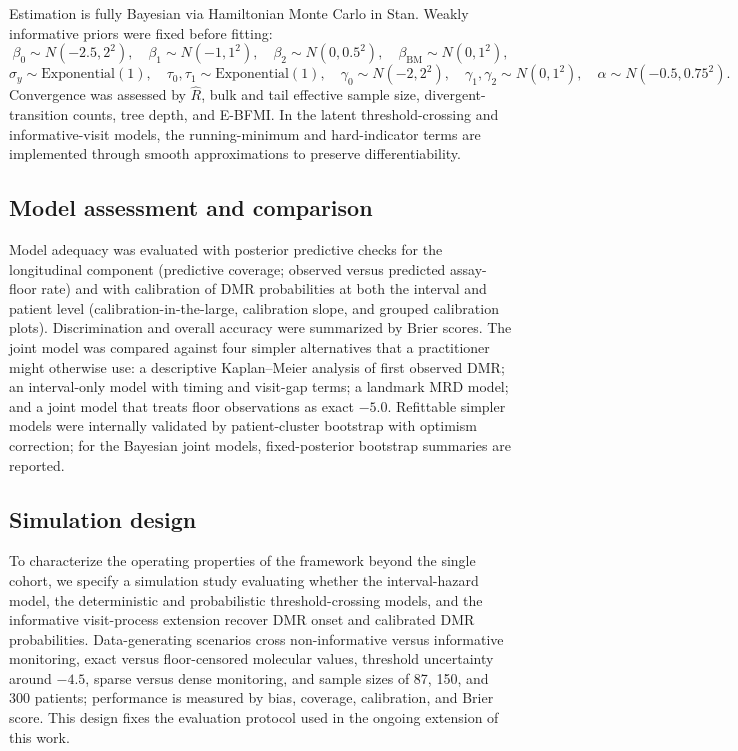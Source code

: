 \documentclass[11pt]{article}
\begin{document}
Estimation is fully Bayesian via Hamiltonian Monte Carlo in Stan.
Weakly informative priors were fixed before fitting:
\[
\beta_0\sim N(-2.5,2^2),\quad
\beta_1\sim N(-1,1^2),\quad
\beta_2\sim N(0,0.5^2),\quad
\beta_{\mathrm{BM}}\sim N(0,1^2),
\]
\[
\sigma_y\sim \mathrm{Exponential}(1),\quad
\tau_0,\tau_1\sim \mathrm{Exponential}(1),\quad
\gamma_0\sim N(-2,2^2),\quad
\gamma_1,\gamma_2\sim N(0,1^2),\quad
\alpha\sim N(-0.5,0.75^2).
\]
Convergence was assessed by $\widehat{R}$, bulk and tail effective sample
size, divergent-transition counts, tree depth, and E-BFMI. In the latent
threshold-crossing and informative-visit models, the running-minimum and
hard-indicator terms are implemented through smooth approximations to
preserve differentiability.

\subsection{Model assessment and comparison}
\label{sec:assessment}

Model adequacy was evaluated with posterior predictive checks for the
longitudinal component (predictive coverage; observed versus predicted
assay-floor rate) and with calibration of DMR probabilities at both the
interval and patient level (calibration-in-the-large, calibration slope,
and grouped calibration plots). Discrimination and overall accuracy were
summarized by Brier scores. The joint model was compared against four
simpler alternatives that a practitioner might otherwise use: a
descriptive Kaplan--Meier analysis of first observed DMR; an interval-only
model with timing and visit-gap terms; a landmark MRD model; and a joint
model that treats floor observations as exact $-5.0$. Refittable simpler
models were internally validated by patient-cluster bootstrap with
optimism correction; for the Bayesian joint models, fixed-posterior
bootstrap summaries are reported.

\subsection{Simulation design}
\label{sec:sim}

To characterize the operating properties of the framework beyond the
single cohort, we specify a simulation study evaluating whether the
interval-hazard model, the deterministic and probabilistic
threshold-crossing models, and the informative visit-process extension
recover DMR onset and calibrated DMR probabilities. Data-generating
scenarios cross non-informative versus informative monitoring, exact
versus floor-censored molecular values, threshold uncertainty around
$-4.5$, sparse versus dense monitoring, and sample sizes of 87, 150, and
300 patients; performance is measured by bias, coverage, calibration, and
Brier score. This design fixes the evaluation protocol used in the ongoing
extension of this work.
\end{document}
